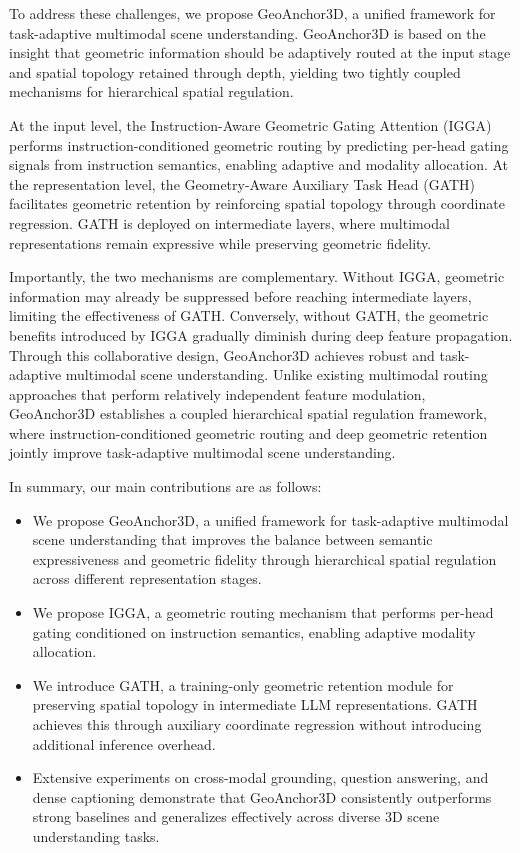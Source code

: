 \documentclass[lettersize,journal]{IEEEtran}
\begin{document}
To address these challenges, we propose GeoAnchor3D, a unified framework for task-adaptive multimodal scene understanding. GeoAnchor3D is based on the insight that geometric information should be adaptively routed at the input stage and spatial topology retained through depth, yielding two tightly coupled mechanisms {for hierarchical spatial regulation.}

At the input level, the Instruction-Aware Geometric Gating Attention (IGGA) performs instruction-conditioned geometric routing by predicting per-head gating signals from instruction semantics, enabling adaptive and modality allocation. At the representation level, the Geometry-Aware Auxiliary Task Head (GATH) facilitates geometric retention by reinforcing spatial topology through coordinate regression. GATH is deployed on intermediate layers, where multimodal representations remain expressive while preserving geometric fidelity.

Importantly, the two mechanisms are complementary. Without IGGA, geometric information may already be suppressed before reaching intermediate layers, limiting the effectiveness of GATH. Conversely, without GATH, the geometric benefits introduced by IGGA gradually diminish during deep feature propagation. Through this collaborative design, GeoAnchor3D achieves robust and task-adaptive multimodal scene understanding. Unlike existing multimodal routing approaches that perform relatively independent feature modulation, GeoAnchor3D establishes a coupled hierarchical spatial regulation framework, where instruction-conditioned geometric routing and deep geometric retention jointly improve task-adaptive multimodal scene understanding.

In summary, our main contributions are as follows:

\begin{itemize}

\item[(i)] {We propose GeoAnchor3D, a unified framework for task-adaptive multimodal scene understanding that improves the balance between semantic expressiveness and geometric fidelity through {hierarchical spatial} regulation across different representation stages.}

\item[(ii)] We propose IGGA, a {geometric} routing mechanism that performs per-head gating conditioned on instruction semantics, enabling adaptive modality allocation.

\item[(iii)] We introduce GATH, a training-only geometric retention module for preserving spatial topology in intermediate LLM representations. GATH achieves this through auxiliary coordinate regression without introducing additional inference overhead.

\item[(iv)] Extensive experiments on cross-modal grounding, question answering, and dense captioning demonstrate that GeoAnchor3D consistently outperforms strong baselines and generalizes effectively across diverse 3D scene understanding tasks.

\end{itemize}
\end{document}
